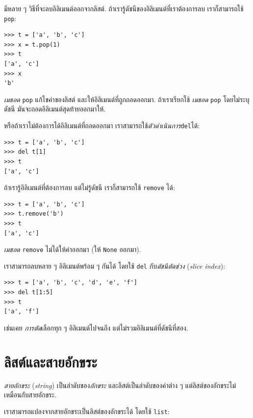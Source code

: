 มีหลาย ๆ วิธีที่จะลบอิลิเมนต์ออกจากลิสต์.
ถ้าเรารู้ดัชนีของอิลิเมนต์ที่เราต้องการลบ 
เราก็สามารถใช้
\texttt{pop}:

\begin{verbatim}
>>> t = ['a', 'b', 'c']
>>> x = t.pop(1)
>>> t
['a', 'c']
>>> x
'b'
\end{verbatim}
%
\textit{เมธอด} \texttt{pop} แก้ไขค่าของลิสต์ และให้อิลิเมนต์ที่ถูกถอดออกมา.
ถ้าเราเรียกใช้ \textit{เมธอด} \texttt{pop} โดยไม่ระบุดัชนี
มันจะถอดอิลิเมนต์สุดท้ายออกมาให้.

หรือถ้าเราไม่ต้องการได้อิลิเมนต์ที่ถอดออกมา เราสามารถใช้\textit{ตัวดำเนินการ}\texttt{del}ได้:

\begin{verbatim}
>>> t = ['a', 'b', 'c']
>>> del t[1]
>>> t
['a', 'c']
\end{verbatim}
%
ถ้าเรารู้อิลิเมนต์ที่ต้องการลบ แต่ไม่รู้ดัชนี
เราก็สามารถใช้ \texttt{remove} ได้:

\begin{verbatim}
>>> t = ['a', 'b', 'c']
>>> t.remove('b')
>>> t
['a', 'c']
\end{verbatim}
%
\textit{เมธอด} \texttt{remove} ไม่ได้ให้ค่าออกมา (ให้  \texttt{None} ออกมา).

เราสามารถลบหลาย ๆ อิลิเมนต์พร้อม ๆ กันได้ โดยใช้ \texttt{del} กับ\textit{ดัชนีตัดช่วง} (\textit{slice index}):

\begin{verbatim}
>>> t = ['a', 'b', 'c', 'd', 'e', 'f']
>>> del t[1:5]
>>> t
['a', 'f']
\end{verbatim}
%
เช่นเคย
\textit{การตัด}เลือกทุก ๆ อิลิเมนต์ไปจนถึง แต่ไม่รวมอิลิเมนต์ที่ดัชนีที่สอง.


\section{ลิสต์และสายอักขระ}

\textit{สายอักขระ} (\textit{string}) เป็นลำดับของ\textit{อักขระ}
และลิสต์เป็นลำดับของค่าต่าง ๆ
แต่ลิสต์ของอักขระไม่เหมือนกับสายอักขระ.

เราสามารถแปลงจากสายอักขระเป็นลิสต์ของอักขระได้ โดยใช้ \texttt{list}:

